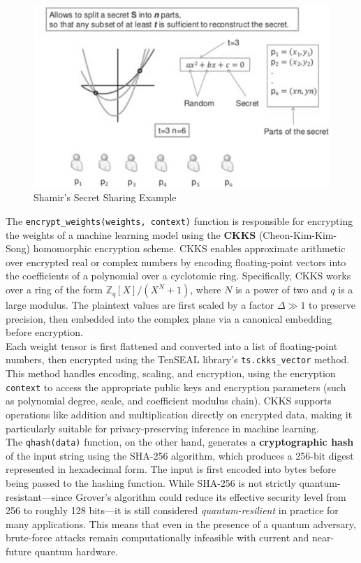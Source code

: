 \documentclass[10pt]{article}
\begin{document}
\begin{figure}[h!]
	\centering
	\includegraphics[height = 0.30\textheight]{img/QFL_code/SSS.png}
	\caption{Shamir's Secret Sharing Example}
\end{figure}

\noindent The \texttt{encrypt\_weights(weights, context)} function is responsible for encrypting the weights of a machine learning model using the \textbf{CKKS} (Cheon-Kim-Kim-Song) homomorphic encryption scheme. CKKS enables approximate arithmetic over encrypted real or complex numbers by encoding floating-point vectors into the coefficients of a polynomial over a cyclotomic ring. Specifically, CKKS works over a ring of the form \( \mathbb{Z}_q[X]/(X^N + 1) \), where \( N \) is a power of two and \( q \) is a large modulus. The plaintext values are first scaled by a factor \( \Delta \gg 1 \) to preserve precision, then embedded into the complex plane via a canonical embedding before encryption.\\
Each weight tensor is first flattened and converted into a list of floating-point numbers, then encrypted using the TenSEAL library's \texttt{ts.ckks\_vector} method. This method handles encoding, scaling, and encryption, using the encryption \texttt{context} to access the appropriate public keys and encryption parameters (such as polynomial degree, scale, and coefficient modulus chain). CKKS supports operations like addition and multiplication directly on encrypted data, making it particularly suitable for privacy-preserving inference in machine learning.\\
The \texttt{qhash(data)} function, on the other hand, generates a \textbf{cryptographic hash} of the input string using the SHA-256 algorithm, which produces a 256-bit digest represented in hexadecimal form. The input is first encoded into bytes before being passed to the hashing function. While SHA-256 is not strictly quantum-resistant—since Grover’s algorithm could reduce its effective security level from 256 to roughly 128 bits—it is still considered \emph{quantum-resilient} in practice for many applications. This means that even in the presence of a quantum adversary, brute-force attacks remain computationally infeasible with current and near-future quantum hardware.
\end{document}
